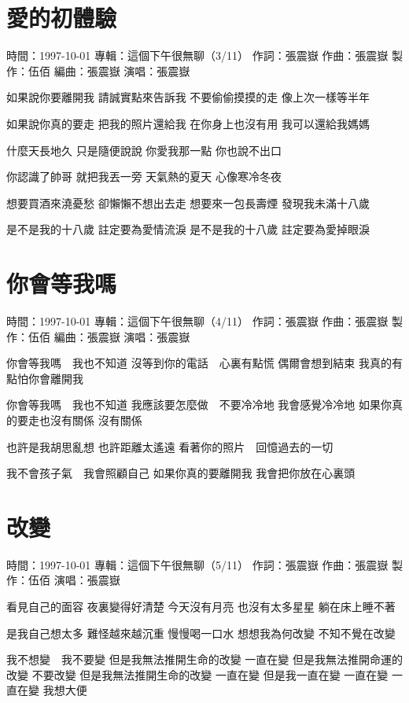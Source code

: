 \documentclass[UTF8,a4paper,oneside,twocolumn,12pt]{ctexbook}
\newcommand{\infopair}[2]{\textbullet #1：#2}
\newcommand{\zc}[1][伍佰]{\infopair{作詞}{#1}}
\newcommand{\zq}[1][伍佰]{\infopair{作曲}{#1}}
\newcommand{\bq}[1][伍佰]{\infopair{編曲}{#1}}
\newcommand{\zj}[1]{\infopair{專輯}{#1}}
\newcommand{\zz}[1]{\infopair{製作}{#1}}
\newcommand{\sj}[1]{\infopair{時間}{#1}}
\newenvironment{info}{\begin{flushleft}\kaishu
	}
	{\end{flushleft}\normalsize\yahei\par}
\newenvironment{lyric}{
	}
{}
\begin{document}
\section{愛的初體驗}
\begin{info}
	\sj{1997-10-01}
	\zj{這個下午很無聊（3/11）}
	\zc[張震嶽]
	\zq[張震嶽]
	\zz{伍佰}
	\bq[張震嶽]
	\infopair{演唱}{張震嶽}
\end{info}
\begin{lyric}
	如果說你要離開我
	請誠實點來告訴我
	不要偷偷摸摸的走
	像上次一樣等半年

	如果說你真的要走
	把我的照片還給我
	在你身上也沒有用
	我可以還給我媽媽

	什麼天長地久
	只是隨便說說
	你愛我那一點
	你也說不出口

	你認識了帥哥
	就把我丟一旁
	天氣熱的夏天
	心像寒冷冬夜

	想要買酒來澆憂愁
	卻懶懶不想出去走
	想要來一包長壽煙
	發現我未滿十八歲

	是不是我的十八歲
	註定要為愛情流淚
	是不是我的十八歲
	註定要為愛掉眼淚
\end{lyric}

\section{你會等我嗎}
\begin{info}
	\sj{1997-10-01}
	\zj{這個下午很無聊（4/11）}
	\zc[張震嶽]
	\zq[張震嶽]
	\zz{伍佰}
	\bq[張震嶽]
	\infopair{演唱}{張震嶽}
\end{info}
\begin{lyric}
	你會等我嗎　我也不知道
	沒等到你的電話　心裏有點慌
	偶爾會想到結束 我真的有點怕你會離開我

	你會等我嗎　我也不知道
	我應該要怎麼做　不要冷冷地
	我會感覺冷冷地 如果你真的要走也沒有關係
	沒有關係

	也許是我胡思亂想 也許距離太遙遠
	看著你的照片　回憶過去的一切

	我不會孩子氣　我會照顧自己
	如果你真的要離開我
	我會把你放在心裏頭
\end{lyric}

\section{改變}
\begin{info}
	\sj{1997-10-01}
	\zj{這個下午很無聊（5/11）}
	\zc[張震嶽]
	\zq[張震嶽]
	\zz{伍佰}
	\infopair{演唱}{張震嶽}
\end{info}
\begin{lyric}
	看見自己的面容 夜裏變得好清楚
	今天沒有月亮 也沒有太多星星
	躺在床上睡不著

	是我自己想太多 難怪越來越沉重
	慢慢喝一口水 想想我為何改變
	不知不覺在改變

	我不想變　我不要變
	但是我無法推開生命的改變 一直在變
	但是我無法推開命運的改變 不要改變
	但是我無法推開生命的改變 一直在變
	但是我一直在變 一直在變
	一直在變 我想大便
\end{lyric}
\end{document}

